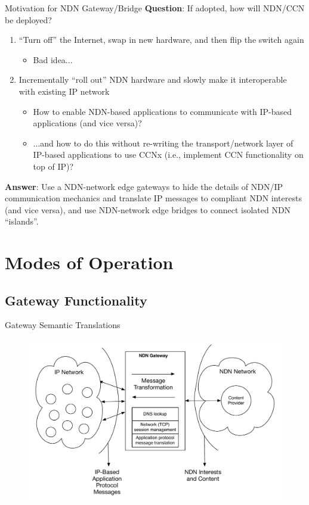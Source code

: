 \documentclass[handout]{beamer}
\begin{document}
\begin{frame}{Motivation for NDN Gateway/Bridge}
	\textbf{Question}: If adopted, how will NDN/CCN be deployed?
	\begin{enumerate}	
		\item ``Turn off'' the Internet, swap in new hardware, and then flip the switch again
		\begin{itemize}
			\item Bad idea...
		\end{itemize}
		\item Incrementally ``roll out'' NDN hardware and slowly make it interoperable with existing IP network
		\begin{itemize}
			\item How to enable NDN-based applications to communicate with IP-based applications (and vice versa)?
			\item ...and how to do this without re-writing the transport/network layer of IP-based applications to use CCNx (i.e., implement CCN functionality on top of IP)?
		\end{itemize}
	\end{enumerate}

	{\bf Answer}: Use a NDN-network edge gateways to hide the details of NDN/IP communication mechanics and translate IP messages to compliant NDN interests (and vice versa), and use NDN-network edge bridges to connect isolated NDN ``islands''.
\end{frame}

\section{Modes of Operation}
\subsection{Gateway Functionality}
\begin{frame}{Gateway Semantic Translations}
	\begin{figure}[h]
		\includegraphics[scale=0.4]{img/gateway_highlevel.pdf}
	\end{figure}
\end{frame}
\end{document}
